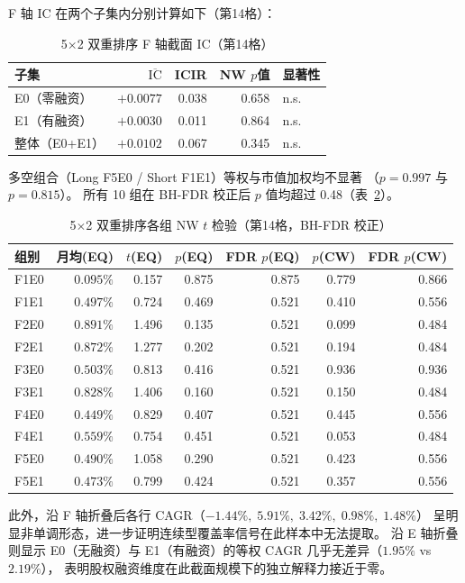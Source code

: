 \documentclass[a4paper,10pt]{article}
\begin{document}
F 轴 IC 在两个子集内分别计算如下（第14格）：

\begin{table}[H]
\centering
\caption{5$\times$2 双重排序 F 轴截面 IC（第14格）}
\label{tab:10g_ic}
\begin{tabular}{@{}lrrrl@{}}
\toprule
子集 & $\overline{\mathrm{IC}}$ & ICIR & NW $p$值 & 显著性 \\
\midrule
E0（零融资） & $+0.0077$ & 0.038 & 0.658 & n.s. \\
E1（有融资） & $+0.0030$ & 0.011 & 0.864 & n.s. \\
整体（E0+E1）& $+0.0102$ & 0.067 & 0.345 & n.s. \\
\bottomrule
\end{tabular}
\end{table}

多空组合（Long F5E0 / Short F1E1）等权与市值加权均不显著
（$p = 0.997$ 与 $p = 0.815$）。
所有 10 组在 BH-FDR 校正后 $p$ 值均超过 0.48（表~\ref{tab:10g_nw}）。

\begin{table}[H]
\centering
\caption{5$\times$2 双重排序各组 NW $t$ 检验（第14格，BH-FDR 校正）}
\label{tab:10g_nw}
\begin{tabular}{@{}lrrrrrr@{}}
\toprule
组别 & 月均(EQ) & $t$(EQ) & $p$(EQ) & FDR $p$(EQ) & $p$(CW) & FDR $p$(CW) \\
\midrule
F1E0 & $0.095\%$ & 0.157 & 0.875 & 0.875 & 0.779 & 0.866 \\
F1E1 & $0.497\%$ & 0.724 & 0.469 & 0.521 & 0.410 & 0.556 \\
F2E0 & $0.891\%$ & 1.496 & 0.135 & 0.521 & 0.099 & 0.484 \\
F2E1 & $0.872\%$ & 1.277 & 0.202 & 0.521 & 0.194 & 0.484 \\
F3E0 & $0.503\%$ & 0.813 & 0.416 & 0.521 & 0.936 & 0.936 \\
F3E1 & $0.828\%$ & 1.406 & 0.160 & 0.521 & 0.150 & 0.484 \\
F4E0 & $0.449\%$ & 0.829 & 0.407 & 0.521 & 0.445 & 0.556 \\
F4E1 & $0.559\%$ & 0.754 & 0.451 & 0.521 & 0.053 & 0.484 \\
F5E0 & $0.490\%$ & 1.058 & 0.290 & 0.521 & 0.423 & 0.556 \\
F5E1 & $0.473\%$ & 0.799 & 0.424 & 0.521 & 0.357 & 0.556 \\
\bottomrule
\end{tabular}
\end{table}

此外，沿 F 轴折叠后各行 CAGR（$-1.44\%,\;5.91\%,\;3.42\%,\;0.98\%,\;1.48\%$）
呈明显非单调形态，进一步证明连续型覆盖率信号在此样本中无法提取。
沿 E 轴折叠则显示 E0（无融资）与 E1（有融资）的等权 CAGR 几乎无差异（$1.95\%$ vs $2.19\%$），
表明股权融资维度在此截面规模下的独立解释力接近于零。
\end{document}
